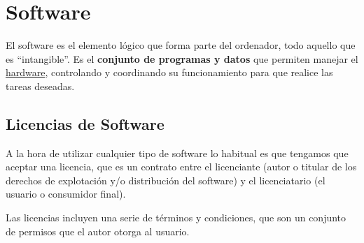 \chapter{Software}
El software es el elemento lógico que forma parte del ordenador, todo aquello que es “intangible”. Es el \textbf{conjunto de programas y datos} que permiten manejar el \hyperlink{hardware}{hardware}, controlando y coordinando su funcionamiento para que realice las tareas deseadas.




\section{Licencias de Software}
A la hora de utilizar cualquier tipo de software lo habitual es que tengamos que aceptar una licencia, que es un contrato entre el licenciante (autor o titular de los derechos de explotación y/o distribución del software) y el licenciatario (el usuario o consumidor final).

Las licencias incluyen una serie de términos y condiciones, que son un conjunto de permisos que el autor otorga al usuario.

